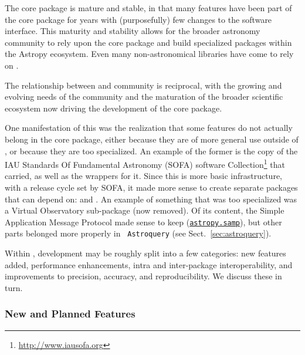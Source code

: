 \documentclass[modern]{aastex631}
\newcommand{\astropysubpkg}[1]{\href{http://docs.astropy.org/en/stable/#1/index.html}{\texttt{astropy.#1}}\xspace}
\begin{document}
The \astropypkg core package is mature and stable, in that many features have
been part of the core package for years with (purposefully) few changes to the
software interface. This maturity and stability allows for the broader
astronomy \python community to rely upon the \astropypkg core package and
build specialized packages within the Astropy ecosystem. Even many
non-astronomical \python libraries have come to rely on \astropypkg.

The relationship between \astropy and community is reciprocal, with the
growing and evolving needs of the community and the maturation of the broader
scientific \python ecosystem now driving the development of the \astropypkg
core package.

One manifestation of this was the realization that some features do not actually
belong in the core package, either because they are of more general use
outside of \astropypkg, or because they are too specialized. An example of the
former is the copy of the IAU Standards Of Fundamental Astronomy (SOFA)
software Collection\footnote{\url{http://www.iausofa.org}} \citep{sofa} that
\astropy carried, as well as the \python wrappers for it.  Since this is more
basic infrastructure, with a release cycle set by SOFA, it made more sense to
create separate packages that \astropypkg can depend on: 
\citep{erfa} and  \citep{pyerfa}. An example of something that
was too specialized was a Virtual Observatory sub-package (now removed).  Of
its content, the Simple Application Message Protocol made sense to keep
(\astropysubpkg{samp}), but other parts belonged more properly in {\tt
Astroquery} (see Sect.~\ref{sec:astroquery}).

Within \astropypkg, development may be roughly split into a few categories:
new features added, performance enhancements, intra and inter-package
interoperability, and improvements to precision, accuracy, and
reproducibility. We discuss these in turn.


\subsubsection*{New and Planned Features} \label{sec:core-features-new}

\end{document}

